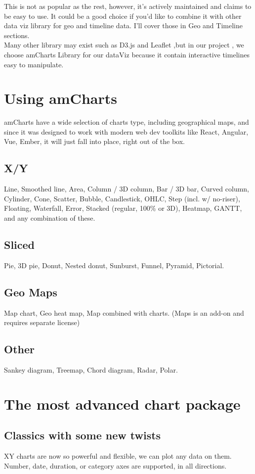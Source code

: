 This is not as popular as the rest, however, it's actively maintained and claims to be easy to use. It could be a good choice if you'd like to combine it with other data viz library for geo and timeline data. I'll cover those in Geo and Timeline sections.\\

Many other library may exist such as D3.js and Leaflet ,but in our project , we choose amCharts Library for our dataViz because it contain interactive timelines easy to manipulate. 

\section{Using amCharts}
amCharts have a wide selection of charts type, including geographical maps, and since it was designed to work with modern web dev toolkits like React, Angular, Vue, Ember, it will just fall into place, right out of the box.\\
\subsection{X/Y}
Line, Smoothed line, Area, Column / 3D column, Bar / 3D bar, Curved column, Cylinder, Cone, Scatter, Bubble, Candlestick, OHLC, Step (incl. w/ no-riser), Floating, Waterfall, Error, Stacked (regular, 100\% or 3D), Heatmap, GANTT, and any combination of these.
\subsection{Sliced}
Pie, 3D pie, Donut, Nested donut, Sunburst, Funnel, Pyramid, Pictorial.
\subsection{Geo Maps}
Map chart, Geo heat map, Map combined with charts. (Maps is an add-on and requires separate license)
\subsection{Other}
Sankey diagram, Treemap, Chord diagram, Radar, Polar.
\newpage
\section{The most advanced chart package}
\subsection*{Classics with some new twists}
XY charts are now so powerful and flexible, we can plot any data on them. Number, date, duration, or category axes are supported, in all directions.\\

